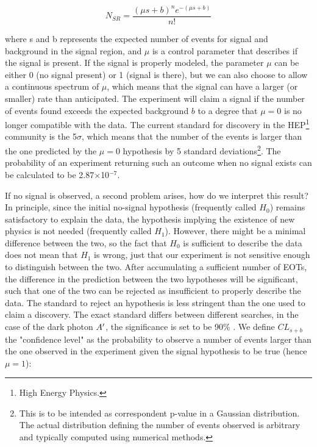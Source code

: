 \begin{equation}
  \label{eq:poisson-simple}
  N_{SR} = \frac{(\mu s + b)^ne^{-(\mu s + b)}}{n!}
\end{equation}

where s and b represents the expected number of events for signal and background in the signal region, and $\mu$ is a control parameter that describes if the signal is present. If the signal is properly modeled, the parameter $\mu$ can be either 0 (no signal present) or 1 (signal is there), but we can also choose to allow a continuous spectrum of $\mu$, which means that the signal can have a larger (or smaller) rate than anticipated. The experiment will claim a signal if the number of events found exceeds the expected background $b$ to a degree that $\mu = 0$ is no longer compatible with the data. The current standard for discovery in the HEP\footnote{High Energy Physics.} community is the 5$\sigma$, which means that the number of the events is larger than the one predicted by the $\mu = 0$ hypothesis by 5 standard deviations\footnote{This is to be intended as correspondent p-value in a Gaussian distribution. The actual distribution defining the number of events observed is arbitrary and typically computed using numerical methods.}. The probability of an experiment returning such an outcome when no signal exists can be calculated to be 2.87$\times$10$^{-7}$.

If no signal is observed, a second problem arises, how do we interpret this result? In principle, since the initial no-signal hypothesis (frequently called $H_0$) remains satisfactory to explain the data, the hypothesis implying the existence of new physics is not needed (frequently called $H_1$). However, there might be a minimal difference between the two, so the fact that $H_0$ is sufficient to describe the data does not mean that $H_1$ is wrong, just that our experiment is not sensitive enough to distinguish between the two. After accumulating a sufficient number of EOTs, the difference in the prediction between the two hypotheses will be significant, such that one of the two can be rejected as insufficient to properly describe the data. The standard to reject an hypothesis is less stringent than the one used to claim a discovery. The exact standard differs between different searches, in the case of the dark photon $A'$, the significance is set to be 90\% \cite{battaglieri2017cosmic}. We define $CL_{s+b}$ the "confidence level" as the probability to observe a number of events larger than the one observed in the experiment given the signal hypothesis to be true (hence $\mu = 1$):

